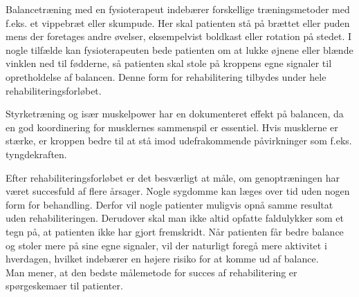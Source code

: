 Balancetræning med en fysioterapeut indebærer forskellige træningsmetoder med f.eks. et vippebræt eller skumpude. Her skal patienten stå på brættet eller puden mens der foretages andre øvelser, eksempelvist boldkast eller rotation på stedet. I nogle tilfælde kan fysioterapeuten bede patienten om at lukke øjnene eller blænde vinklen ned til fødderne, så patienten skal stole på kroppens egne signaler til opretholdelse af balancen. \cite{Joergensen2004} Denne form for rehabilitering tilbydes under hele rehabiliteringsforløbet. \cite{Sundhedsstyrelsen2011a}

Styrketræning og især muskelpower har en dokumenteret effekt på balancen, da en god koordinering for musklernes sammenspil er essentiel. Hvis musklerne er stærke, er kroppen bedre til at stå imod udefrakommende påvirkninger som f.eks. tyngdekraften. \cite{Joergensen2004}

Efter rehabiliteringsforløbet er det besværligt at måle, om genoptræningen har været succesfuld af flere årsager. Nogle sygdomme kan læges over tid uden nogen form for behandling. Derfor vil nogle patienter muligvis opnå samme resultat uden rehabiliteringen. Derudover skal man ikke altid opfatte faldulykker som et tegn på, at patienten ikke har gjort fremskridt. Når patienten får bedre balance og stoler mere på sine egne signaler, vil der naturligt foregå mere aktivitet i hverdagen, hvilket indebærer en højere risiko for at komme ud af balance. \cite{Hain2008} \\
Man mener, at den bedste målemetode for succes af rehabilitering er spørgeskemaer til patienter. \cite{Hain2008}